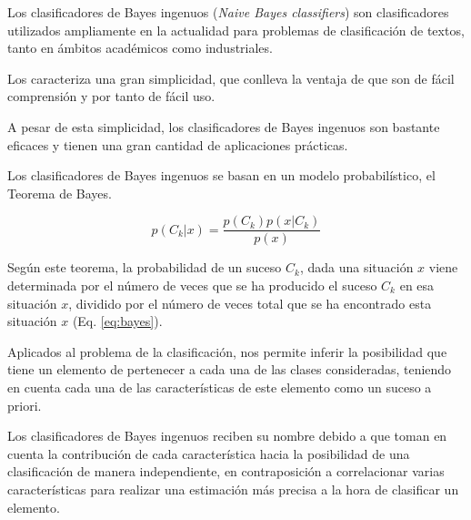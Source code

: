 \lhead{\emph{\ChapterTwo{}}}
Los clasificadores de Bayes ingenuos (\textit{Naive Bayes classifiers}) son clasificadores utilizados ampliamente en la actualidad para problemas de clasificación de textos, tanto en ámbitos académicos como industriales.

Los caracteriza una gran simplicidad, que conlleva la ventaja de que son de fácil comprensión y por tanto de fácil uso.

A pesar de esta simplicidad, los clasificadores de Bayes ingenuos son bastante eficaces y tienen una gran cantidad de aplicaciones prácticas.

Los clasificadores de Bayes ingenuos se basan en un modelo probabilístico, el Teorema de Bayes.

\begin{equation}\label{eq:bayes}
    p(C_k|x) = \frac{p(C_k)p(x|C_k)}{p(x)}
\end{equation}

Según este teorema, la probabilidad de un suceso $C_k$, dada una situación $x$ viene determinada por el número de veces que se ha producido el suceso $C_k$ en esa situación $x$, dividido por el número de veces total que se ha encontrado esta situación $x$
(Eq. \ref{eq:bayes}).

Aplicados al problema de la clasificación, nos permite inferir la posibilidad que tiene un elemento de pertenecer a cada una de las clases consideradas, teniendo en cuenta cada una de las características de este elemento como un suceso a priori.

Los clasificadores de Bayes ingenuos reciben su nombre debido a que toman en cuenta la contribución de cada característica hacia la posibilidad de una clasificación de manera independiente, en contraposición a correlacionar varias características para realizar una estimación más precisa a la hora de clasificar un elemento.
